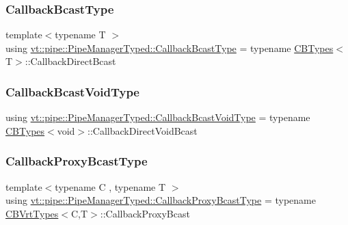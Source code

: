 \subsubsection{\texorpdfstring{Callback\+Bcast\+Type}{CallbackBcastType}}
{\footnotesize\ttfamily template$<$typename T $>$ \\
using \hyperlink{structvt_1_1pipe_1_1_pipe_manager_typed_a4176395e8a35ec2a809890a9aad5b29e}{vt\+::pipe\+::\+Pipe\+Manager\+Typed\+::\+Callback\+Bcast\+Type} =  typename \hyperlink{structvt_1_1pipe_1_1_pipe_manager_typed_a62dfc4fabe734915f3ec2544e225b6b3}{C\+B\+Types}$<$T$>$\+::Callback\+Direct\+Bcast}

\mbox{\label{structvt_1_1pipe_1_1_pipe_manager_typed_ab028a342e37daeacc38acbfc185e0997}} 
\subsubsection{\texorpdfstring{Callback\+Bcast\+Void\+Type}{CallbackBcastVoidType}}
{\footnotesize\ttfamily using \hyperlink{structvt_1_1pipe_1_1_pipe_manager_typed_ab028a342e37daeacc38acbfc185e0997}{vt\+::pipe\+::\+Pipe\+Manager\+Typed\+::\+Callback\+Bcast\+Void\+Type} =  typename \hyperlink{structvt_1_1pipe_1_1_pipe_manager_typed_a62dfc4fabe734915f3ec2544e225b6b3}{C\+B\+Types}$<$void$>$\+::Callback\+Direct\+Void\+Bcast}

\mbox{\label{structvt_1_1pipe_1_1_pipe_manager_typed_a74e5f1a359ab32259f855998f867d93a}} 
\subsubsection{\texorpdfstring{Callback\+Proxy\+Bcast\+Type}{CallbackProxyBcastType}}
{\footnotesize\ttfamily template$<$typename C , typename T $>$ \\
using \hyperlink{structvt_1_1pipe_1_1_pipe_manager_typed_a74e5f1a359ab32259f855998f867d93a}{vt\+::pipe\+::\+Pipe\+Manager\+Typed\+::\+Callback\+Proxy\+Bcast\+Type} =  typename \hyperlink{structvt_1_1pipe_1_1_pipe_manager_typed_abb75b2bfdb23ebfa7f4f677a7f4bcb77}{C\+B\+Vrt\+Types}$<$C,T$>$\+::Callback\+Proxy\+Bcast}

